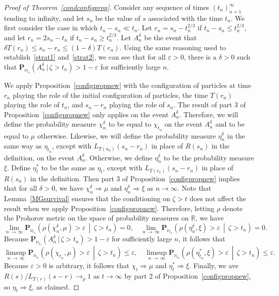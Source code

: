 \documentclass[10pt]{amsart}
\theoremstyle{definition}\newtheorem{defi}[theo]{Definition}\newtheorem{rema}[theo]{Remark}\newtheorem{exam}[theo]{Example}\newtheorem{exem}[theo]{Example}\newtheorem{nota}[theo]{Notation}
\newcommand*\eps{\varepsilon}
\renewcommand*\P{\mathbf{P}}
\newcommand*\R{\mathbb{R}}
\newcommand{\1} {\mathds{1}}
\begin{document}
\begin{proof}[Proof of Theorem~\ref{condconfigprop}]
Consider any sequence of times $(t_n)_{n=1}^{\infty}$ tending to infinity, and let $s_n$ be the value of $s$ associated with the time $t_n$. We first consider the case in which $t_n - s_n \ll t_n$. Let $r_n = s_n - t_n^{2/3}$ if $t_n - s_n \leq t_n^{2/3}$, and let $r_n = 2s_n - t_n$ if $t_n - s_n \geq t_n^{2/3}$. Let $A_n^{\delta}$ be the event that $\delta T(r_n) \leq s_n - r_n \leq (1 - \delta) T(r_n)$. Using the same reasoning used to establish~\eqref{strat1} and~\eqref{strat2}, we can see that for all $\eps > 0$, there is a $\delta > 0$ such that $\P_{\nu_{t_n}}(A_n^{\delta} \,|\, \zeta > t_n) > 1 - \eps$ for sufficiently large $n$.

We apply Proposition~\ref{configpropnew} with the configuration of particles at time $r_n$ playing the role of the initial configuration of particles, the time $T(r_n)$ playing the role of $t_n$, and $s_n - r_n$ playing the role of $s_n$. The result of part 3 of Proposition~\ref{configpropnew} only applies on the event $A_n^{\delta}$. Therefore, we will define the probability measure $\chi_n^{\delta}$ to be equal to $\chi_{t_n}$ on the event $A_n^{\delta}$ and to be equal to $\mu$ otherwise. Likewise, we will define the probability measure $\eta_n^{\delta}$ in the same way as $\eta_{t_n}$, except with $L_{T(u_n)}(s_n - r_n)$ in place of $R(s_n)$ in the definition, on the event $A_n^{\delta}$. Otherwise, we define $\eta_n^{\delta}$ to be the probability measure $\xi$. Define $\eta_t^*$ to be the same as $\eta_t$, except with $L_{T(r_n)}(s_n - r_n)$ in place of $R(s_n)$ in the definition. Then part 3 of Proposition~\ref{configpropnew} implies that for all $\delta > 0$, we have $\chi_n^{\delta} \Rightarrow \mu$ and $\eta_n^{\delta} \Rightarrow \xi$ as $n \rightarrow \infty$. Note that Lemma~\ref{MGsurvival} ensures that the conditioning on $\zeta > t$ does not affect the result when we apply Proposition~\ref{configpropnew}.
Therefore, letting $\rho$ denote the Prohorov metric on the space of probability measures on $\R$, we have
\[
\lim_{n\,\rightarrow\,\infty} \P_{\nu_{t_n}}\left(\rho\left(\chi_n^{\delta}, \mu\right) > \eps\,\middle|\,\zeta > t_n\right) = 0, \quad\lim_{n\,\rightarrow\,\infty} \P_{\nu_{t_n}}\left(\rho\left(\eta_n^{\delta}, \xi\right) > \eps\,\middle|\,\zeta > t_n\right) = 0.
\]
Because $\P_{\nu_{t_n}}(A_n^{\delta} \,|\, \zeta > t_n) > 1 - \eps$ for sufficiently large $n$, it follows that
\[
\limsup_{n\,\rightarrow\,\infty} \P_{\nu_{t_n}}\left(\rho\left(\chi_{t_n}, \mu\right) > \eps\,\middle|\, \zeta > t_n\right) \leq \eps, \quad\limsup_{n\,\rightarrow\,\infty} \P_{\nu_{t_n}}\left(\rho\left(\eta^*_{t_n}, \xi\right) > \eps\,\middle|\,\zeta > t_n\right) \leq \eps.
\]
Because $\eps > 0$ is arbitrary, it follows that $\chi_t \Rightarrow \mu$ and $\eta_t^* \Rightarrow \xi$. Finally, we ave $R(s)/L_{T(r)}(s - r) \rightarrow_p 1$ as $t \rightarrow \infty$ by part 2 of Proposition~\ref{configpropnew}, so $\eta_t \Rightarrow \xi$, as claimed.


\end{proof}
\end{document}
